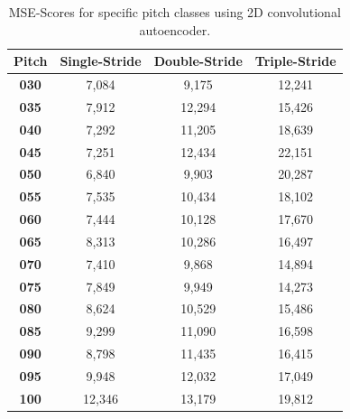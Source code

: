 \begin{table}[htb!]
    \centering
    \begin{tabular}{|c|c|c|c|}
        \hline
         \textbf{Pitch} & \textbf{Single-Stride} & \textbf{Double-Stride} & \textbf{Triple-Stride}\\
         \hline
         \textbf{030} & 7,084 & 9,175 & 12,241\\
         \hline
         \textbf{035} & 7,912 & 12,294 & 15,426\\
         \hline
         \textbf{040} & 7,292 & 11,205 & 18,639\\
         \hline
         \textbf{045} & 7,251 & 12,434 & 22,151\\
         \hline
         \textbf{050} & 6,840 & 9,903 & 20,287\\
         \hline
         \textbf{055} & 7,535 & 10,434 & 18,102\\
         \hline
         \textbf{060} & 7,444 & 10,128 & 17,670\\
         \hline
         \textbf{065} & 8,313 & 10,286 & 16,497\\
         \hline
         \textbf{070} & 7,410 & 9,868 & 14,894\\
         \hline
         \textbf{075} & 7,849 & 9,949 & 14,273\\
         \hline
         \textbf{080} & 8,624 & 10,529 & 15,486\\
         \hline
         \textbf{085} & 9,299 & 11,090 & 16,598\\
         \hline
         \textbf{090} & 8,798 & 11,435 & 16,415\\
         \hline
         \textbf{095} & 9,948 & 12,032 & 17,049\\
         \hline
         \textbf{100} & 12,346 & 13,179 & 19,812\\
         \hline
    \end{tabular}
    \caption{MSE-Scores for specific pitch classes using 2D convolutional autoencoder.}
    \label{tab:res_scores_2D_pitch}
\end{table}

